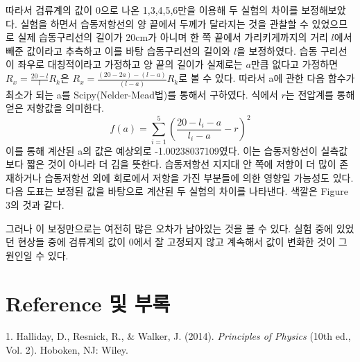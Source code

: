 \documentclass[a4paper]{article}
\begin{document}
	따라서 검류계의 값이 0으로 나온 1,3,4,5,6만을 이용해 두 실험의 차이를 보정해보았다.
	실험을 하면서 습동저항선의 양 끝에서 두께가 달라지는 것을 관찰할 수 있었으므로 실제 습동구리선의 길이가 20\si{cm}가 아니며 한 쪽 끝에서 가리키게까지의 거리 $l$에서 빼준 값이라고 추측하고 이를 바탕 습동구리선의 길이와 $l$을 보정하였다.
	습동 구리선이 좌우로 대칭적이라고 가정하고 양 끝의 길이가 실제로는 $a$만큼 없다고 가정하면 $R_x = \frac{20-l}{l} R_k$은 $R_x = \frac{(20-2a)-(l-a)}{(l-a)} R_k$로 볼 수 있다.
	따라서 a에 관한 다음 함수가 최소가 되는 a를 Scipy(Nelder-Mead법)를 통해서 구하였다.
	식에서 $r$는 전압계를 통해 얻은 저항값을 의미한다.
	\begin{equation}
		f(a) = \sum_{i=1}^{5} ( \frac{20-l_i-a}{l_i-a} - r ) ^2
	\end{equation}
	이를 통해 계산된 a의 값은 예상외로 -1.00238037109였다.
	이는 습동저항선이 실측값보다 짧은 것이 아니라 더 김을 뜻한다.
	습동저항선 지지대 안 쪽에 저항이 더 많이 존재하거나 습동저항선 외에 회로에서 저항을 가진 부분들에 의한 영향일 가능성도 있다. 
	다음 도표는 보정된 값을 바탕으로 계산된 두 실험의 차이를 나타낸다.
	색깔은 Figure 3의 것과 같다.
	\begin{figure}[h]
	\centering
	\end{figure}

	그러나 이 보정만으로는 여전히 많은 오차가 남아있는 것을 볼 수 있다.
	실험 중에 있었던 현상들 중에 검류계의 값이 0에서 잘 고정되지 않고 계속해서 값이 변화한 것이 그 원인일 수 있다.
	

\section{Reference 및 부록}
	1. Halliday, D., Resnick, R., \& Walker, J. (2014). {\it{}Principles of Physics} (10th ed., Vol. 2). Hoboken, NJ: Wiley.
	\\ 
\end{document}
